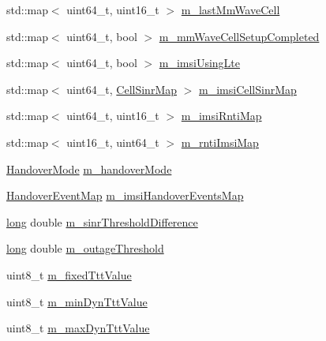 \begin{DoxyCompactItemize}
\item 
std\+::map$<$ uint64\+\_\+t, uint16\+\_\+t $>$ \hyperlink{classns3_1_1LteEnbRrc_a0d7b04f0383b0dc3f6a7360b87cbaeee}{m\+\_\+last\+Mm\+Wave\+Cell}
\item 
std\+::map$<$ uint64\+\_\+t, bool $>$ \hyperlink{classns3_1_1LteEnbRrc_ad19d6f4c123115e1d13e34609781ab20}{m\+\_\+mm\+Wave\+Cell\+Setup\+Completed}
\item 
std\+::map$<$ uint64\+\_\+t, bool $>$ \hyperlink{classns3_1_1LteEnbRrc_a99427e888b10d095491e72bf062511db}{m\+\_\+imsi\+Using\+Lte}
\item 
std\+::map$<$ uint64\+\_\+t, \hyperlink{namespacens3_a1a41652a34d3ad5a6fb5d9a0f57e29f8}{Cell\+Sinr\+Map} $>$ \hyperlink{classns3_1_1LteEnbRrc_a72b3ce5c1f8495e96bfc0f384ecf3a96}{m\+\_\+imsi\+Cell\+Sinr\+Map}
\item 
std\+::map$<$ uint64\+\_\+t, uint16\+\_\+t $>$ \hyperlink{classns3_1_1LteEnbRrc_a62fdfad7c92cc5e477bf345e372f954e}{m\+\_\+imsi\+Rnti\+Map}
\item 
std\+::map$<$ uint16\+\_\+t, uint64\+\_\+t $>$ \hyperlink{classns3_1_1LteEnbRrc_aef2cb4b08656331de9edc343095eb2b6}{m\+\_\+rnti\+Imsi\+Map}
\item 
\hyperlink{classns3_1_1LteEnbRrc_a92c80910218354db2ad7ac531f896c94}{Handover\+Mode} \hyperlink{classns3_1_1LteEnbRrc_aa68424e6be8a396baf7fbad34e4dde06}{m\+\_\+handover\+Mode}
\item 
\hyperlink{classns3_1_1LteEnbRrc_a339e378e7ccb6a59a9b32c673e453036}{Handover\+Event\+Map} \hyperlink{classns3_1_1LteEnbRrc_a6f703158e9a4ceaccbd1c5df7f5b0ba1}{m\+\_\+imsi\+Handover\+Events\+Map}
\item 
\hyperlink{generate__test__data__lte__sinr_8m_a0eab6be67e93c3411f7a8b53cc297285}{long} double \hyperlink{classns3_1_1LteEnbRrc_aef56a65c644f6ed3c5f28a540ded624f}{m\+\_\+sinr\+Threshold\+Difference}
\item 
\hyperlink{generate__test__data__lte__sinr_8m_a0eab6be67e93c3411f7a8b53cc297285}{long} double \hyperlink{classns3_1_1LteEnbRrc_adf505b71799b8dbd81372695f14a0716}{m\+\_\+outage\+Threshold}
\item 
uint8\+\_\+t \hyperlink{classns3_1_1LteEnbRrc_aa71134df59929e78ccfa621bfadd3414}{m\+\_\+fixed\+Ttt\+Value}
\item 
uint8\+\_\+t \hyperlink{classns3_1_1LteEnbRrc_a76d3b1fbe9168d1e581e709085ff7958}{m\+\_\+min\+Dyn\+Ttt\+Value}
\item 
uint8\+\_\+t \hyperlink{classns3_1_1LteEnbRrc_a79683e5ba7b9fff045f36e4bb5afce3a}{m\+\_\+max\+Dyn\+Ttt\+Value}

\end{DoxyCompactItemize}
